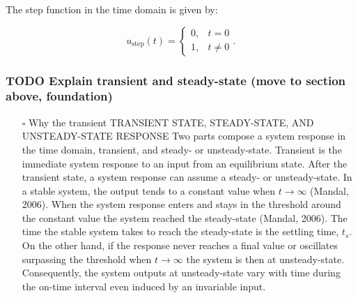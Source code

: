 \documentclass{article}
\begin{document}
The step function in the time domain is given by:

\begin{equation}\label{eq:Step function in time domain P7}
	u_{\mbox{step}}(t) =
	\begin{cases}
 	0, & t = 0 \\
  	1, & t \ne 0
	\end{cases}.
\end{equation}

\subsubsection{TODO Explain transient and steady-state (move to section above, foundation)}
\label{sec:orge2dcfb7}
\begin{itemize}
\item[{$\square$}] Why the transient
TRANSIENT STATE, STEADY-STATE, AND UNSTEADY-STATE RESPONSE
Two parts compose a system response in the time domain, transient, and steady- or unsteady-state.
Transient is the immediate system response to an input from an equilibrium state.
After the transient state, a system response can assume a steady- or unsteady-state.
In a stable system, the output tends to a constant value when \(t→∞\) (Mandal, 2006).
When the system response enters and stays in the threshold around the constant value the system reached the steady-state (Mandal, 2006).
The time the stable system takes to reach the steady-state is the settling time, \(t_s\).
On the other hand, if the response never reaches a final value or oscillates surpassing the threshold when \(t→∞\) the system is then at unsteady-state.
Consequently, the system outputs at unsteady-state vary with time during the on-time interval even induced by an invariable input.
\end{itemize}
\end{document}
